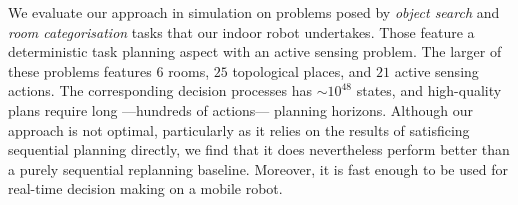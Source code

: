 We evaluate our approach in simulation on problems posed by {\em
object search} and {\em room categorisation} tasks that our indoor
robot undertakes. Those feature a deterministic task planning aspect
with an active sensing problem. The larger of these problems features
$6$ rooms, $25$ topological places, and $21$ active sensing
actions. The corresponding decision processes has $\sim 10^{48}$
states, and high-quality plans require long ---hundreds of actions---
planning horizons.
Although our approach is not optimal, particularly as it relies on the
results of satisficing sequential planning directly, we find that it
does nevertheless perform better than a purely sequential replanning
baseline. Moreover, it is fast enough to be used for real-time
decision making on a mobile robot.








